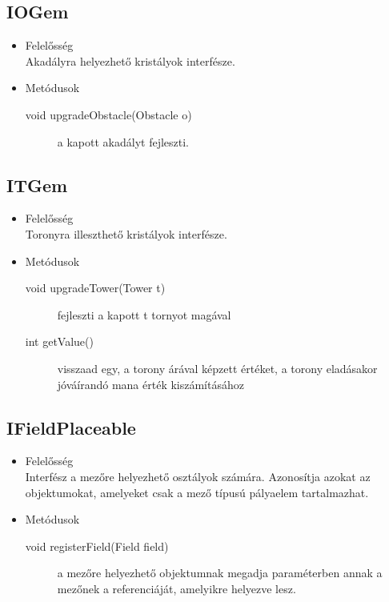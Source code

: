 \subsection{IOGem}
\begin{itemize}
\item Felelősség\\
Akadályra helyezhető kristályok interfésze.

\item Metódusok\\
	\begin{description}
		\item[void upgradeObstacle(Obstacle o)] a kapott akadályt fejleszti.
		
	\end{description}
\end{itemize}
\subsection{ITGem}
\begin{itemize}
\item Felelősség\\
Toronyra illeszthető kristályok interfésze.

\item Metódusok\\
	\begin{description}
		\item[void upgradeTower(Tower t)] fejleszti a kapott t tornyot magával 
\item[int getValue()] visszaad egy, a torony árával képzett értéket, a torony eladásakor jóváírandó mana érték kiszámításához 

		
	\end{description}
\end{itemize}
\subsection{IFieldPlaceable}
\begin{itemize}
\item Felelősség\\
Interfész a mezőre helyezhető osztályok számára. Azonosítja azokat az objektumokat, amelyeket csak a mező típusú pályaelem tartalmazhat.

\item Metódusok\\
	\begin{description}
		\item[void registerField(Field field)] a mezőre helyezhető objektumnak megadja  paraméterben annak a mezőnek a referenciáját, amelyikre helyezve lesz.

		
	\end{description}
\end{itemize}
